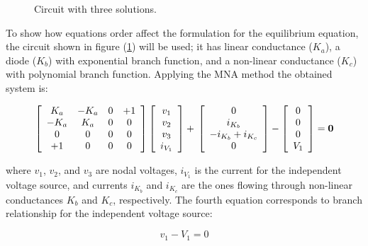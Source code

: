 \documentclass[conference,letterpaper,onecolumn,11pt]{IEEEtran}
\newcommand{\pig}[1]{\mbox{\boldmath ${#1}$}	}
\begin{document}
\begin{figure}[t]
\centerline{
\epsfxsize=70mm
}
\caption{Circuit with three solutions.}
\label{cirejemplo}
\end{figure}

To show how equations order affect the formulation for the equilibrium equation, the circuit shown in figure (\ref{cirejemplo}) will be used; it has linear conductance ({$K_a$}), a diode ({$K_b$}) with exponential branch function, and a non-linear conductance ($K_c$) with polynomial branch function. Applying the MNA method the obtained system is:

{%
\begin{equation}
\left[ \begin{array}{cccc}
K_a  & -K_a & 0 & +1\\
-K_a & K_a  & 0 & 0 \\
0   & 0    & 0 & 0 \\
+1   & 0    & 0 & 0 
\end{array} \right]
\left[ \begin{array}{c}
v_1\\ v_2\\ v_3\\ i_{V_1}
\end{array} \right]
+ \newline \\
\left[ \begin{array}{c}
0\\ i_{K_b}\\-i_{K_b}+i_{K_c} \\ 0 \end{array} \right]
-
\left[ \begin{array}{c}
0\\ 0\\ 0\\V_1 \end{array} \right]
= \pig{0}
\label{eqsimple}
\end{equation}}

where $v_1$, $v_2$, and $v_3$ are nodal voltages, $i_{V_1}$ is the current for the independent voltage source, and currents $i_{K_b}$ and $i_{K_c}$ are the ones flowing through non-linear conductances $K_b$ and $K_c$, respectively. The fourth equation corresponds to branch relationship for the independent voltage source:

\begin{displaymath}
v_1-V_1=0
\end{displaymath}
\end{document}
